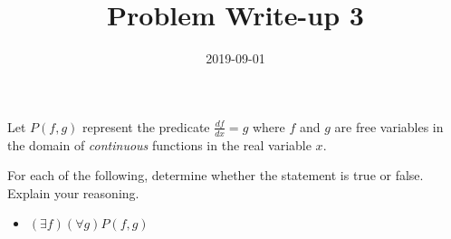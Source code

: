 \documentclass[a4paper,12pt]{article}
\title{Problem Write-up 3}
\date{2019-09-01}
\begin{document}
    \begin{problem}
        Let \(P(f,g)\) represent the predicate \(\frac{df}{dx} = g\) where \(f\) and \(g\) are free variables in the domain of \textit{continuous} functions in the real variable \(x\).

        For each of the following, determine whether the statement is true or false. Explain your reasoning.

        \begin{itemize}
            \item \((\exists f)(\forall g) P(f,g)\)
        \end{itemize}
    \end{problem}

    \begin{answer}
        
    \end{answer}
\end{document}
